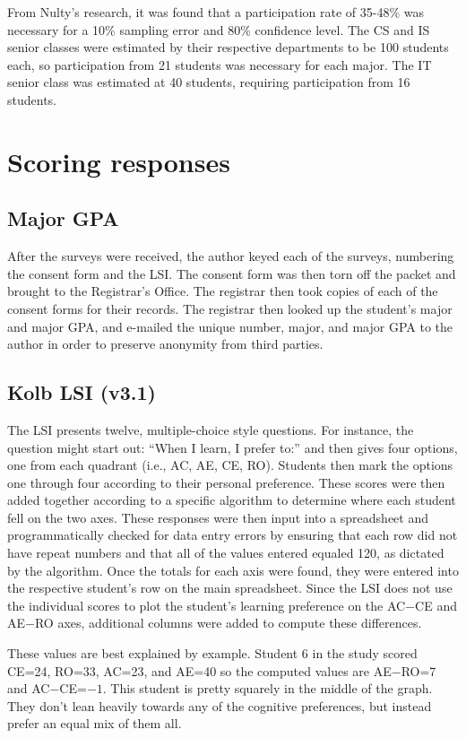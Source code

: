 From Nulty's research, it was found that a participation rate of 35-48\% was necessary for a 10\% sampling error and 80\% confidence level. The CS and IS senior classes were estimated by their respective departments to be 100 students each, so participation from 21 students was necessary for each major. The IT senior class was estimated at 40 students, requiring participation from 16 students.

\section{Scoring responses}
\subsection{Major GPA}
After the surveys were received, the author keyed each of the surveys, numbering the consent form and the LSI. The consent form was then torn off the packet and brought to the Registrar's Office. The registrar then took copies of each of the consent forms for their records. The registrar then looked up the student's major and major GPA, and e-mailed the unique number, major, and major GPA to the author in order to preserve anonymity from third parties.

\subsection{Kolb LSI (v3.1)}
The LSI presents twelve, multiple-choice style questions. For instance, the question might start out: ``When I learn, I prefer to:'' and then gives four options, one from each quadrant (i.e., AC, AE, CE, RO). Students then mark the options one through four according to their personal preference. These scores were then added together according to a specific algorithm to determine where each student fell on the two axes. These responses were then input into a spreadsheet and programmatically checked for data entry errors by ensuring that each row did not have repeat numbers and that all of the values entered equaled 120, as dictated by the algorithm. Once the totals for each axis were found, they were entered into the respective student's row on the main spreadsheet. Since the LSI does not use the individual scores to plot the student's learning preference on the AC$-$CE and AE$-$RO axes, additional columns were added to compute these differences.

These values are best explained by example. Student 6 in the study scored CE=24, RO=33, AC=23, and AE=40 so the computed values are AE$-$RO=7 and AC$-$CE=$-1$. This student is pretty squarely in the middle of the graph. They don't lean heavily towards any of the cognitive preferences, but instead prefer an equal mix of them all.

